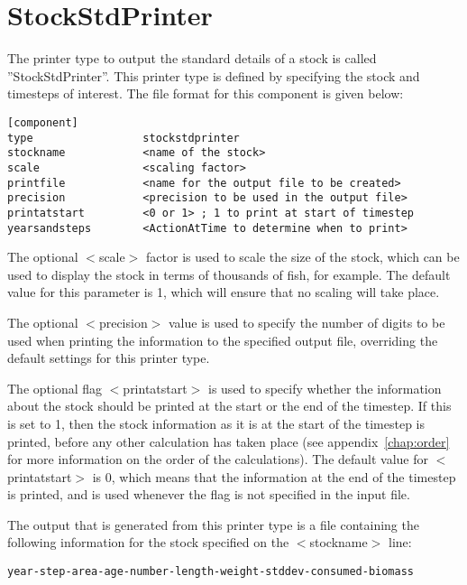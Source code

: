 \documentclass[10pt,twoside]{book}
\begin{document}
\newpage %
\section{StockStdPrinter}\label{sec:stockstdprinter}
The printer type to output the standard details of a stock is called ''StockStdPrinter''.  This printer type is defined by specifying the stock and timesteps of interest.  The file format for this component is given below:

{\small\begin{verbatim}
[component]
type                 stockstdprinter
stockname            <name of the stock>
scale                <scaling factor>
printfile            <name for the output file to be created>
precision            <precision to be used in the output file>
printatstart         <0 or 1> ; 1 to print at start of timestep
yearsandsteps        <ActionAtTime to determine when to print>
\end{verbatim}}

The optional $<$scale$>$ factor is used to scale the size of the stock, which can be used to display the stock in terms of thousands of fish, for example.  The default value for this parameter is 1, which will ensure that no scaling will take place.

\bigskip
The optional $<$precision$>$ value is used to specify the number of digits to be used when printing the information to the specified output file, overriding the default settings for this printer type.

\bigskip
The optional flag $<$printatstart$>$ is used to specify whether the information about the stock should be printed at the start or the end of the timestep.  If this is set to 1, then the stock information as it is at the start of the timestep is printed, before any other calculation has taken place (see appendix~\ref{chap:order} for more information on the order of the calculations).  The default value for $<$printatstart$>$ is 0, which means that the information at the end of the timestep is printed, and is used whenever the flag is not specified in the input file.

\bigskip
The output that is generated from this printer type is a file containing the following information for the stock specified on the $<$stockname$>$ line:

{\small\begin{verbatim}
year-step-area-age-number-length-weight-stddev-consumed-biomass
\end{verbatim}}
\end{document}

